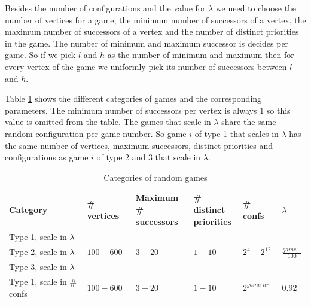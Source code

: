 Besides the number of configurations and the value for $\lambda$ we need to choose the number of vertices for a game, the minimum number of successors of a vertex, the maximum number of successors of a vertex and the number of distinct priorities in the game. The number of minimum and maximum successor is decides per game. So if we pick $l$ and $h$ as the number of minimum and maximum then for every vertex of the game we uniformly pick its number of successors between $l$ and $h$.

Table \ref{tab_random_games} shows the different categories of games and the corresponding parameters. The minimum number of successors per vertex is always 1 so this value is omitted from the table. The games that scale in $\lambda$ share the same random configuration per game number. So game $i$ of type 1 that scales in $\lambda$ has the same number of vertices, maximum successors, distinct priorities and configurations as game $i$ of type 2 and 3 that scale in $\lambda$.

\begin{table}[]
\centering
	\begin{tabular}{|l|l|l|l|l|l|}
		\hline
		Category & \# vertices & \shortstack{Maximum \\\# successors} & \shortstack{\# distinct\\priorities} & \# confs  & $\lambda$ \\ \hline
		Type 1, scale in $\lambda$ & & & & & \\ \cline{1-1}  
		Type 2, scale in $\lambda$ &$100-600$  & $3-20$                   & $1-10$                          & $2^{4}-2^{12}$ & $\frac{\textit{game nr}}{100}$            \\ \cline{1-1} 
		Type 3, scale in $\lambda$ & & & & & \\ \hline
		Type 1, scale in \# confs          & $100-600$            &  $3-20$                   & $1-10$                          & $2^\textit{game nr}$                & $0.92$                   \\ \hline
	\end{tabular}
\caption{Categories of random games}
	\label{tab_random_games}
\end{table}
